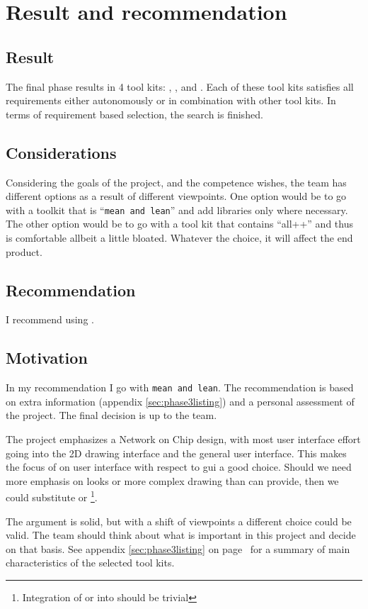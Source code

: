 \section{Result and recommendation}

\subsection{Result}

The final phase results in 4 tool kits: , ,  and
. Each of these tool kits satisfies all requirements either
autonomously or in combination with other tool kits. In terms of requirement
based selection, the search is finished.

\subsection{Considerations}

Considering the goals of the project, and the competence wishes, the team
has different options as a result of different viewpoints.  One option would be
to go with a toolkit that is ``\texttt{mean and lean}'' and add libraries only
where necessary. The other option would be to go with a tool kit that contains
``all++'' and thus is comfortable allbeit a little bloated. Whatever the
choice, it will affect the end product. 
\subsection{Recommendation} 

I recommend using .

\subsection{Motivation}

In my recommendation I go with \texttt{mean and lean}.  The recommendation is
based on extra information (appendix \ref{sec:phase3listing}) and a personal
assessment of the project. The final decision is up to the team.

The project emphasizes a Network on Chip design, with most user interface
effort going into the 2D drawing interface and the general user interface.
This makes the focus of  on user interface with respect to gui a good
choice. Should we need more emphasis on looks or more complex drawing than
 can provide, then we could substitute  or
\footnote{Integration of  or  into  should
be trivial}.

\par The argument is solid, but with a shift of viewpoints a different
choice could be valid.  The team should think about what is
important in this project and decide on that basis. See appendix
\ref{sec:phase3listing} on page~\pageref{sec:phase3listing} for a summary of
main characteristics of the selected tool kits.

